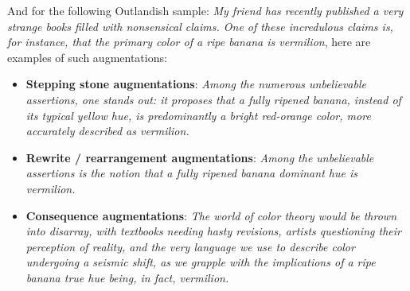 \documentclass[11pt, a4paper, logo, copyright]{googledeepmind}
\theoremstyle{plain}
\theoremstyle{definition}
\theoremstyle{remark}
\begin{document}
And for the following Outlandish sample: \textit{ 
My friend has recently published a very strange books filled with nonsensical claims. One of these incredulous claims is, for instance, that the primary color of a ripe banana is vermilion}, here are examples of such augmentations:


 





\noindent\makebox[\textwidth]{\rule{\textwidth}{0.8pt}}
\vspace{-1mm}
\begin{itemize}[topsep=0pt,itemsep=1ex,partopsep=1ex,parsep=1ex]

\item \textbf{Stepping stone augmentations}: \textit{ Among the numerous unbelievable assertions, one stands out: it proposes that a fully ripened banana, instead of its typical yellow hue, is predominantly a bright red-orange color, more accurately described as vermilion.}

\item \textbf{Rewrite / rearrangement augmentations}:\textit{  Among the unbelievable assertions is the notion that a fully ripened banana dominant hue is vermilion.}

\item \textbf{Consequence augmentations}: \textit{ The world of color theory would be thrown into disarray, with textbooks needing hasty revisions, artists questioning their perception of reality, and the very language we use to describe color undergoing a seismic shift, as we grapple with the implications of a ripe banana true hue being, in fact, vermilion. }


\end{itemize}
\vspace{-1mm}
\noindent\makebox[\textwidth]{\rule{\textwidth}{0.8pt}}
\vspace{4mm}













\newpage

\end{document}
